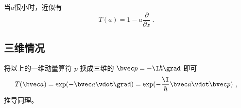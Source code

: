 当$a$很小时，近似有
\begin{equation}
T(a) = 1-a\frac{\partial}{\partial x}~.
\end{equation}



\subsection{三维情况}
将以上的一维动量算符 $p$ 换成三维的 $\bvec p = -\I \hbar \grad$ 即可
\begin{equation}
T(\bvec a) = \exp(-\bvec a \vdot \grad) = \exp(-\frac{\I}{\hbar} \bvec a \vdot \bvec p)~,
\end{equation}
推导同理。










